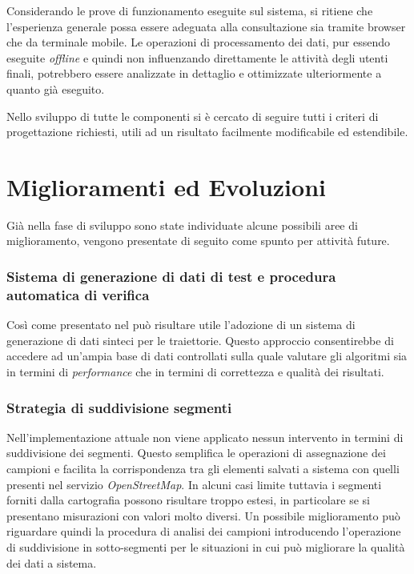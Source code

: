 Considerando le prove di funzionamento eseguite sul sistema, si ritiene che l'esperienza generale possa essere adeguata alla consultazione sia tramite browser che da terminale mobile. Le operazioni di processamento dei dati, pur essendo eseguite \emph{offline} e quindi non influenzando direttamente le attività degli utenti finali, potrebbero essere analizzate in dettaglio e ottimizzate ulteriormente a quanto già eseguito.

Nello sviluppo di tutte le componenti si è cercato di seguire tutti i criteri di progettazione richiesti, utili ad un risultato facilmente modificabile ed estendibile.

\section{Miglioramenti ed Evoluzioni}
Già nella fase di sviluppo sono state individuate alcune possibili aree di miglioramento, vengono presentate di seguito come spunto per attività future.
\subsubsection{Sistema di generazione di dati di test e procedura automatica di verifica}
Così come presentato nel \cite[capitolo~3.4]{mdme} può risultare utile l'adozione di un sistema di generazione di dati sinteci per le traiettorie. Questo approccio consentirebbe di accedere ad un'ampia base di dati controllati sulla quale valutare gli algoritmi sia in termini di \emph{performance} che in termini di correttezza e qualità dei risultati.

\subsubsection{Strategia di suddivisione segmenti}
Nell'implementazione attuale non viene applicato nessun intervento in termini di suddivisione dei segmenti. Questo semplifica le operazioni di assegnazione dei campioni e facilita la corrispondenza tra gli elementi salvati a sistema con quelli presenti nel servizio \emph{OpenStreetMap}. In alcuni casi limite tuttavia i segmenti forniti dalla cartografia possono risultare troppo estesi, in particolare se si presentano misurazioni con valori molto diversi. Un possibile miglioramento può riguardare quindi la procedura di analisi dei campioni introducendo l'operazione di suddivisione in sotto-segmenti per le situazioni in cui può migliorare la qualità dei dati a sistema.

